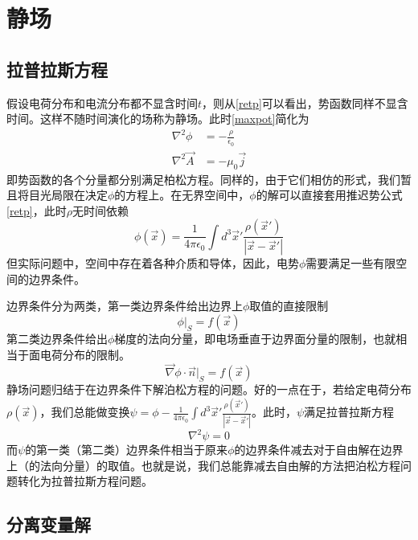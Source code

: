 \documentclass[a4paper,11pt]{ctexart}
\newcommand{\beq}{\begin{equation}}
\newcommand{\eeq}{\end{equation}}
\newcommand{\bea}{\begin{equation}\begin{aligned}}
\newcommand{\eea}{\end{aligned}\end{equation}}
\newcommand{\del}{\vec{\nabla}}
\newcommand{\epv}{\epsilon_0}
\begin{document}
\section{静场}
\subsection{拉普拉斯方程}
假设电荷分布和电流分布都不显含时间$t$，则从\cref{retp}可以看出，势函数同样不显含时间。这样不随时间演化的场称为静场。此时\cref{maxpot}简化为
\bea
\nabla^2 \phi &= - \frac{\rho}{\epv}\\
\nabla^2 \vec A &= - \mu_0 \vec j
\eea
即势函数的各个分量都分别满足柏松方程。同样的，由于它们相仿的形式，我们暂且将目光局限在决定$\phi$的方程上。在无界空间中，$\phi$的解可以直接套用推迟势公式\cref{retp}，此时$\rho$无时间依赖
\beq
\phi(\vec{x}) = \frac{1}{4\pi \epv} \int d^3 \vec{x}' \frac{\rho(\vec{x}')}{\left|\vec{x} - \vec{x}'\right|}
\eeq
但实际问题中，空间中存在着各种介质和导体，因此，电势$\phi$需要满足一些有限空间的边界条件。
\par
边界条件分为两类，第一类边界条件给出边界上$\phi$取值的直接限制
\beq
\phi \big|_{S} = f(\vec{x})
\eeq
第二类边界条件给出$\phi$梯度的法向分量，即电场垂直于边界面分量的限制，也就相当于面电荷分布的限制。
\beq
\del \phi \cdot \vec{n} \big|_S= f(\vec{x})
\eeq
静场问题归结于在边界条件下解泊松方程的问题。好的一点在于，若给定电荷分布$\rho(\vec{x})$，我们总能做变换$\psi = \phi - \frac{1}{4\pi \epv} \int d^3 \vec{x}' \frac{\rho(\vec{x}')}{\left|\vec{x} - \vec{x}'\right|}$。此时，$\psi$满足拉普拉斯方程
\beq
\nabla^2 \psi = 0
\eeq
而$\psi$的第一类（第二类）边界条件相当于原来$\phi$的边界条件减去对于自由解在边界上（的法向分量）的取值。也就是说，我们总能靠减去自由解的方法把泊松方程问题转化为拉普拉斯方程问题。

\subsection{分离变量解}
\end{document}
